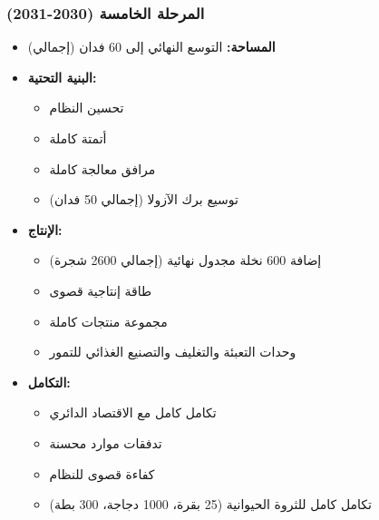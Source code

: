 \subsubsection{المرحلة الخامسة (2030-2031)}
\begin{itemize}
    \item \textbf{المساحة:} التوسع النهائي إلى 60 فدان (إجمالي)
    \item \textbf{البنية التحتية:}
    \begin{itemize}
        \item تحسين النظام
        \item أتمتة كاملة
        \item مرافق معالجة كاملة
        \item توسيع برك الآزولا (إجمالي 50 فدان)
    \end{itemize}
    \item \textbf{الإنتاج:}
    \begin{itemize}
        \item إضافة 600 نخلة مجدول نهائية (إجمالي 2600 شجرة)
        \item طاقة إنتاجية قصوى
        \item مجموعة منتجات كاملة
        \item وحدات التعبئة والتغليف والتصنيع الغذائي للتمور
    \end{itemize}
    \item \textbf{التكامل:}
    \begin{itemize}
        \item تكامل كامل مع الاقتصاد الدائري
        \item تدفقات موارد محسنة
        \item كفاءة قصوى للنظام
        \item تكامل كامل للثروة الحيوانية (25 بقرة، 1000 دجاجة، 300 بطة)
    \end{itemize}
\end{itemize}

